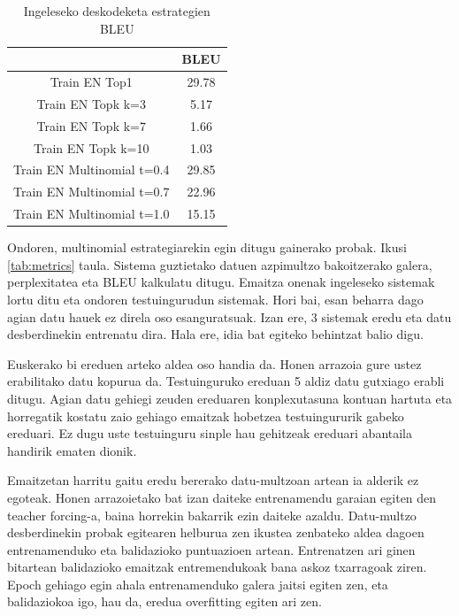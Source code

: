 \documentclass[11pt,a4paper]{article}
\begin{document}
\begin{table}
\centering
\begin{tabular}{ |c|c| } 
    \hline
    & BLEU \\
    \hline
    Train EN Top1 & 29.78 \\ 
    Train EN Topk k=3 & 5.17 \\ 
    Train EN Topk k=7 & 1.66 \\ 
    Train EN Topk k=10 & 1.03 \\ 
    Train EN Multinomial t=0.4 & 29.85 \\ 
    Train EN Multinomial t=0.7 & 22.96 \\ 
    Train EN Multinomial t=1.0 & 15.15 \\ 
    \hline
\end{tabular}
\caption{Ingeleseko deskodeketa estrategien BLEU}
\label{tab:decoding}
\end{table}

Ondoren, multinomial estrategiarekin egin ditugu gainerako probak. Ikusi \ref{tab:metrics} taula. Sistema guztietako datuen azpimultzo bakoitzerako galera, perplexitatea eta BLEU kalkulatu ditugu. Emaitza onenak ingeleseko sistemak lortu ditu eta ondoren testuingurudun sistemak. Hori bai, esan beharra dago agian datu hauek ez direla oso esanguratsuak. Izan ere, 3 sistemak eredu eta datu desberdinekin entrenatu dira. Hala ere, idia bat egiteko behintzat balio digu.

Euskerako bi ereduen arteko aldea oso handia da. Honen arrazoia gure ustez erabilitako datu kopurua da. Testuinguruko ereduan 5 aldiz datu gutxiago erabli ditugu. Agian datu gehiegi zeuden ereduaren konplexutasuna kontuan hartuta eta horregatik kostatu zaio gehiago emaitzak hobetzea testuingururik gabeko ereduari. Ez dugu uste testuinguru sinple hau gehitzeak ereduari abantaila handirik ematen dionik.

Emaitzetan harritu gaitu eredu bererako datu-multzoan artean ia alderik ez egoteak. Honen arrazoietako bat izan daiteke entrenamendu garaian egiten den teacher forcing-a, baina horrekin bakarrik ezin daiteke azaldu. Datu-multzo desberdinekin probak egitearen helburua zen ikustea zenbateko aldea dagoen entrenamenduko eta balidazioko puntuazioen artean. Entrenatzen ari ginen bitartean balidazioko emaitzak entremendukoak bana askoz txarragoak ziren. Epoch gehiago egin ahala entrenamenduko galera jaitsi egiten zen, eta balidaziokoa igo, hau da, eredua overfitting egiten ari zen.
\end{document}
